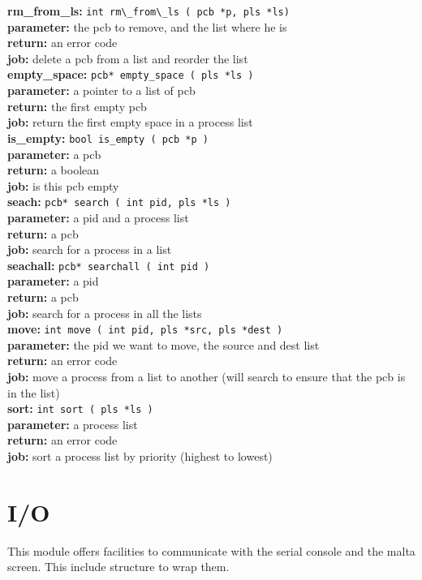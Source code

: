 \noindent\textbf{rm\_from\_ls:} \verb+int rm\_from\_ls ( pcb *p, pls *ls)+\\
\textbf{parameter:} the pcb to remove, and the list where he is\\
\textbf{return:} an error code\\
\textbf{job:} delete a pcb from a list and reorder the list\\

\noindent\textbf{empty\_space:} \verb+pcb* empty_space ( pls *ls )+\\
\textbf{parameter:} a pointer to a list of pcb\\
\textbf{return:} the first empty pcb\\
\textbf{job:} return the first empty space in a process list\\

\noindent\textbf{is\_empty:} \verb+bool is_empty ( pcb *p )+\\
\textbf{parameter:} a pcb\\
\textbf{return:} a boolean\\
\textbf{job:} is this pcb empty\\

\noindent\textbf{seach:} \verb+pcb* search ( int pid, pls *ls )+\\
\textbf{parameter:} a pid and a process list\\
\textbf{return:} a pcb\\
\textbf{job:} search for a process in a list\\

\noindent\textbf{seachall:} \verb+pcb* searchall ( int pid )+\\
\textbf{parameter:} a pid\\
\textbf{return:} a pcb\\
\textbf{job:} search for a process in all the lists\\

\noindent\textbf{move:} \verb+int move ( int pid, pls *src, pls *dest )+\\
\textbf{parameter:} the pid we want to move, the source and dest list\\
\textbf{return:} an error code\\
\textbf{job:} move a process from a list to another (will search to ensure that the pcb is in the list)\\

\noindent\textbf{sort:} \verb+int sort ( pls *ls )+\\
\textbf{parameter:} a process list\\
\textbf{return:} an error code\\
\textbf{job:} sort a process list by priority (highest to lowest)\\

\section{I/O}

This module offers facilities to communicate with the serial console and the malta screen. This include structure to wrap them.

